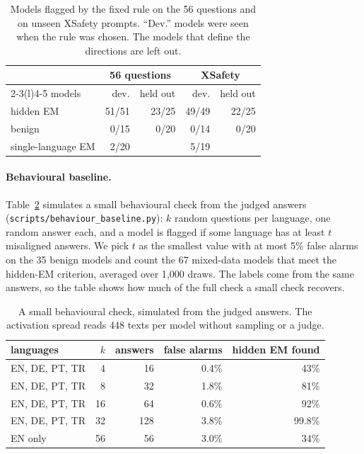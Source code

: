 \documentclass[11pt]{article}
\begin{document}
\begin{table}[!htb]
\centering\footnotesize
\begin{tabular}{@{}lrrrr@{}}
\toprule
& \multicolumn{2}{c}{56 questions} & \multicolumn{2}{c}{XSafety} \\
\cmidrule(lr){2-3}\cmidrule(l){4-5}
models & dev. & held out & dev. & held out \\
\midrule
hidden EM & 51/51 & 23/25 & 49/49 & 22/25 \\
benign & 0/15 & 0/20 & 0/14 & 0/20 \\
single-language EM & 2/20 & & 5/19 & \\
\bottomrule
\end{tabular}
\caption{Models flagged by the fixed rule on the 56 questions and on unseen XSafety prompts. ``Dev.'' models were seen when the rule was chosen. The models that define the directions are left out.}
\label{tab:unseen}
\end{table}

\paragraph{Behavioural baseline.} Table~\ref{tab:baseline} simulates a small behavioural check from the judged answers (\texttt{scripts/behaviour\_baseline.py}): $k$ random questions per language, one random answer each, and a model is flagged if some language has at least $t$ misaligned answers. We pick $t$ as the smallest value with at most 5\% false alarms on the 35 benign models and count the 67 mixed-data models that meet the hidden-EM criterion, averaged over 1{,}000 draws. The labels come from the same answers, so the table shows how much of the full check a small check recovers.

\begin{table}[!htb]
\centering\footnotesize
\begin{tabular}{@{}lrrrr@{}}
\toprule
languages & $k$ & answers & false alarms & hidden EM found \\
\midrule
EN, DE, PT, TR & 4 & 16 & 0.4\% & 43\% \\
EN, DE, PT, TR & 8 & 32 & 1.8\% & 81\% \\
EN, DE, PT, TR & 16 & 64 & 0.6\% & 92\% \\
EN, DE, PT, TR & 32 & 128 & 3.8\% & 99.8\% \\
EN only & 56 & 56 & 3.0\% & 34\% \\
\bottomrule
\end{tabular}
\caption{A small behavioural check, simulated from the judged answers. The activation spread reads 448 texts per model without sampling or a judge.}
\label{tab:baseline}
\end{table}
\end{document}
